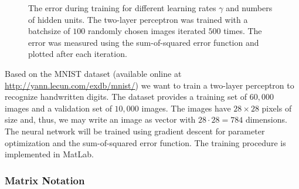 \begin{figure}
{	}
	\caption[Error on the training set during training.]{The error during training for different learning rates $\gamma$ and numbers of hidden units. The two-layer perceptron was trained with a batchsize of $100$ randomly chosen images iterated $500$ times. The error was measured using the sum-of-squared error function and plotted after each iteration.}
\end{figure}

Based on the MNIST dataset (available online at \href{http://yann.lecun.com/exdb/mnist/}{http://yann.lecun.com/exdb/mnist/}) we want to train a two-layer perceptron to recognize handwritten digits. The dataset provides a training set of $60,000$ images and a validation set of $10,000$ images. The images have $28 \times 28$ pixels of size and, thus, we may write an image as vector with $28 \cdot 28 = 784$ dimensions. The neural network will be trained using gradient descent for parameter optimization and the sum-of-squared error function. The training procedure is implemented in MatLab.

\subsubsection{Matrix Notation}

